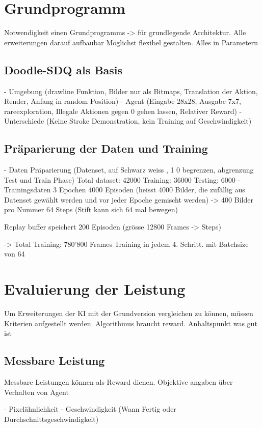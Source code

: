 \section{Grundprogramm}
Notwendigkeit einen Grundprogramms 
-> für grundlegende Architektur. Alle erweiterungen darauf aufbaubar
Möglichst flexibel gestalten. Alles in Parametern

\subsection*{Doodle-SDQ als Basis}
- Umgebung (drawline Funktion, Bilder nur als Bitmaps, Translation der Aktion, Render, Anfang in random Position)
- Agent (Eingabe 28x28, Ausgabe 7x7, rareexploration, Illegale Aktionen gegen 0 gehen lassen, Relativer Reward)
- Unterschiede (Keine Stroke Demonstration, kein Training auf Geschwindigkeit)

\subsection*{Präparierung der Daten und Training}
- Daten Präparierung (Datenset, auf Schwarz weiss , 1 0 begrenzen, abgrenzung Test und Train Phase)
    Total dataset: 42000
    Training: 36000
    Testing: 6000
- Trainingsdaten 
    3 Epochen
    4000 Episoden (heisst 4000 Bilder, die zufällig aus Datenset gewählt werden und vor jeder Epoche gemischt werden) -> 400 Bilder pro Nummer
    64 Steps (Stift kann sich 64 mal bewegen)

    Replay buffer speichert 200 Episoden (grösse 12800 Frames -> Steps)

    -> Total Training: 780'800 Frames
    Training in jedem 4. Schritt. mit Batchsize von 64


\section{Evaluierung der Leistung}
Um Erweiterungen der KI mit der Grundversion vergleichen zu können, müssen Kriterien aufgestellt werden. 
Algorithmus braucht reward. Anhaltspunkt was gut ist

\subsection*{Messbare Leistung}
Messbare Leistungen können als Reward dienen. Objektive angaben über Verhalten von Agent

- Pixelähnlichkeit
- Geschwindigkeit (Wann Fertig oder Durchschnittsgeschwindigkeit)

